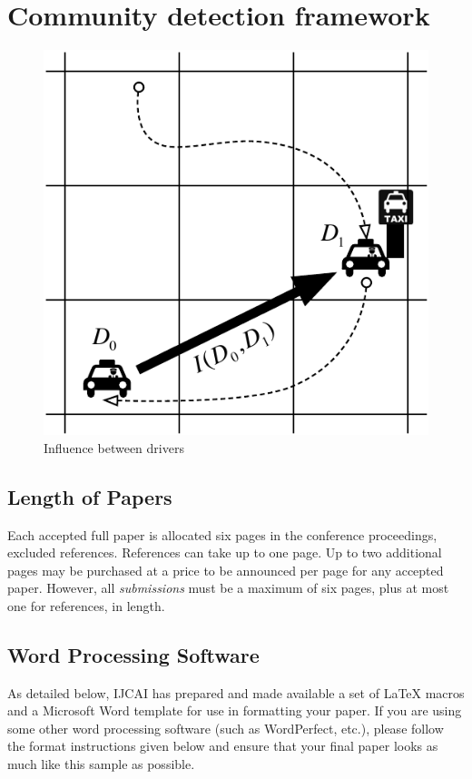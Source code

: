 \documentclass{article}
\begin{document}
\section{Community detection framework} \label{sec:comDectectionFramework}


\begin{figure} [h]
  \centering
  \includegraphics[width=0.8\linewidth]{figs/driverInfluence}
  \caption{Influence between drivers}
  \label{fig:driverInfluence}
\end{figure}



\subsection{Length of Papers}

Each accepted full paper is allocated six pages in the conference 
proceedings, excluded references. References can take up to one page.
Up to two additional pages may be purchased at a price 
to be announced per page for any accepted paper. However, all 
{\em submissions} must 
be a maximum of six pages, plus at most one for references, in length.


\subsection{Word Processing Software}

As detailed below, IJCAI has prepared and made available a set of
\LaTeX{} macros and a Microsoft Word template for use in formatting
your paper. If you are using some other word processing software (such
as WordPerfect, etc.), please follow the format instructions given
below and ensure that your final paper looks as much like this sample
as possible.
\end{document}

